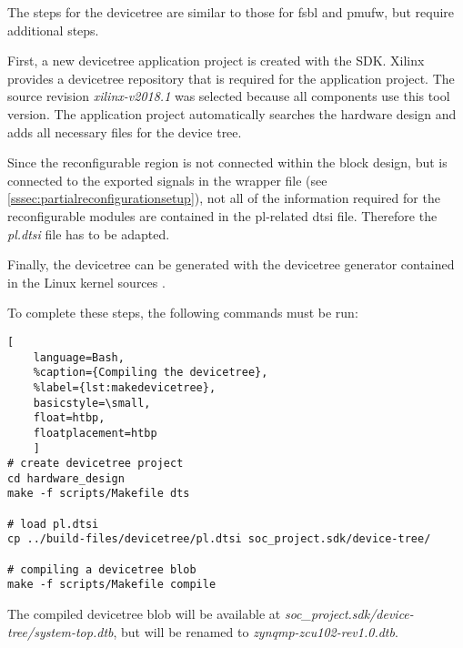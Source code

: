 The steps for the devicetree are similar to those for \gls{fsbl} and \gls{pmufw}, but require additional steps.

First, a new devicetree application project is created with the SDK. Xilinx provides a devicetree repository \cite{devicetree} that is required for the application project. The source revision \emph{xilinx-v2018.1} was selected because all components use this tool version. The application project automatically searches the hardware design and adds all necessary files for the device tree.

Since the reconfigurable region is not connected within the block design, but is connected to the exported signals in the wrapper file (see \cref{sssec:partialreconfigurationsetup}), not all of the information required for the reconfigurable modules are contained in the \gls{pl}-related \gls{dtsi} file. Therefore the \emph{pl.dtsi} file has to be adapted.

Finally, the devicetree can be generated with the devicetree generator contained in the Linux kernel sources \cite{linuxkernel}.

To complete these steps, the following commands must be run:
\begin{lstlisting}[
	language=Bash,
	%caption={Compiling the devicetree},
	%label={lst:makedevicetree},
	basicstyle=\small,
	float=htbp,
	floatplacement=htbp
	]
# create devicetree project
cd hardware_design
make -f scripts/Makefile dts

# load pl.dtsi
cp ../build-files/devicetree/pl.dtsi soc_project.sdk/device-tree/

# compiling a devicetree blob
make -f scripts/Makefile compile
\end{lstlisting}
\FloatBarrier

The compiled devicetree blob will be available at \emph{soc_project.sdk/device-tree/system-top.dtb}, but will be renamed to \emph{zynqmp-zcu102-rev1.0.dtb}.